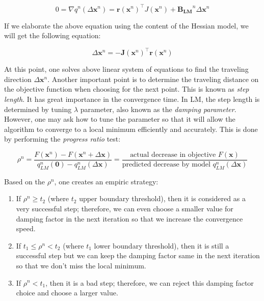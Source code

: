 \documentclass[a4paper]{report}
\numberwithin{figure}{section}
\begin{document}
\begin{appendices}
\begin{equation}\label{eq:lm_descent_direction}
  0 = 
  \nabla q^{n}(\Delta \mathbf{x}^n) = 
  \mathbf{r}(\mathbf{x}^n)^\top J(\mathbf{x}^n) + 
  \mathbf{B_{LM}}^n\Delta \mathbf{x}^n
\end{equation}


If we elaborate the above equation using the content of the Hessian model, 
we will get the following equation: 

\begin{equation}
  [\mathbf{J}(\mathbf{x}^n)^\top\mathbf{J}(\mathbf{x}^n) + 
  \lambda^n\mathbf{I}]\Delta \mathbf{x}^n = 
  -\mathbf{J}(\mathbf{x}^n)^\top\mathbf{r}(\mathbf{x}^n)
\end{equation}\label{eq:damping_full}

At this point, one solves above linear system of equations to find the traveling direction 
$\Delta \mathbf{x}^n$. Another important point is to determine the traveling 
distance on the objective function when choosing for the next point. This 
is known as \textit{step length}. It has great importance in the 
convergence time. 
In LM, the step length is determined by tuning $\lambda$ parameter, also 
known as the 
\textit{damping parameter}. However, one may ask 
how to tune the parameter 
so that it will allow the algorithm to converge to a local minimum efficiently 
and accurately. This is done by performing the \textit{progress ratio} test:

\begin{equation}\label{eq:lm_progress_ratio}
  \rho^n = \frac{F(\mathbf{x}^n) - F(\mathbf{x}^n+\Delta \mathbf{x})}{q_{LM}^n(\mathbf{0})-q_{LM}^n(\Delta \mathbf{x})} =
  \frac{\text{actual decrease in objective } F(\mathbf{x})}
  {\text{predicted decrease by model } q_{LM}^n(\Delta \mathbf{\mathbf{x}})}
\end{equation}

Based on the $\rho^n$, one creates an empiric strategy:

\begin{enumerate}
  \item If $\rho^n \geq t_2$ (where $t_2$ upper boundary threshold), then it is considered as a very successful step; 
    therefore, we can even choose a smaller value for damping factor in the 
    next iteration 
    so that 
    we increase the convergence speed.
  \item If $t_1 \leq \rho^n < t_2$ (where $t_1$ lower boundary threshold), 
  then it is still a successful step but we 
    can keep the damping factor same in the next iteration so that we don't 
    miss the local minimum.
  \item If $\rho^n < t_1$, then it is a bad step; therefore, we can reject this 
    damping factor choice and choose a larger value.
\end{enumerate}


\end{appendices}
\end{document}
